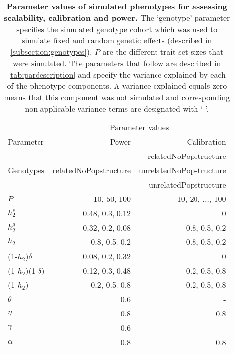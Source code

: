 \begin{table}[htbp]
  \centering
  \caption[\textbf{Parameter values of simulated phenotypes for assessing scalability, calibration and power.}]{\textbf{Parameter values of simulated phenotypes for assessing scalability, calibration and power.} The `genotype' parameter specifies the simulated genotype cohort which was used to simulate fixed and random genetic effects (described in \cref{subsection:genotypes}). \(P\) are the different trait set sizes that were simulated. The parameters that follow are described in \cref{tab:pardescription} and specify the variance explained by each of the phenotype components. A variance explained equals zero means that this component was not simulated and corresponding non-applicable variance terms are designated with `-'.} 
    \begin{tabular}{lrr}
    \toprule
          & \multicolumn{2}{c}{Parameter values} \\
\cmidrule{2-3}    Parameter & Power  & Calibration \\
    \midrule
    \multicolumn{1}{c}{\multirow{3}[1]{*}{Genotypes}} & \multicolumn{1}{c}{\multirow{3}[1]{*}{relatedNoPopstructure}} & relatedNoPopstructure \\
          &       & unrelatedNoPopstructure \\
          &       & unrelatedPopstructure \\
          \addlinespace[1.5ex]
    \(P\) & 10, 50, 100 & 10, 20, \(\ldots\), 100 \\
   \addlinespace[1.5ex]
    \(h_2^s\) & 0.48, 0.3, 0.12 & 0 \\
    \(h_2^g\) & 0.32, 0.2, 0.08 & 0.8, 0.5, 0.2 \\
    \(h_2\) & 0.8, 0.5, 0.2 & 0.8, 0.5, 0.2 \\
    (1-\(h_2\))\(\delta\) & 0.08, 0.2, 0.32 & 0 \\
    (1-\(h_2\))(1-\(\delta\)) & 0.12, 0.3, 0.48 & 0.2, 0.5, 0.8 \\
    (1-\(h_2\)) & 0.2, 0.5, 0.8 & 0.2, 0.5, 0.8 \\
    \(\theta\) & 0.6   &  - \\
    \(\eta\) & 0.8   & 0.8 \\
    \(\gamma\) & 0.6   &  - \\
    \(\alpha\) & 0.8   & 0.8 \\
    \bottomrule
    \end{tabular}%
\label{tab:parvalues}%
\end{table}%

